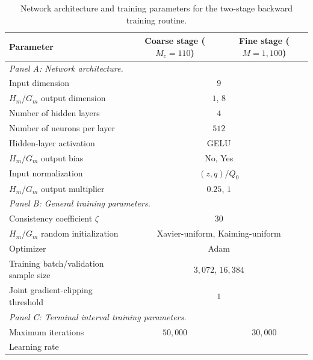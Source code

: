 \begin{table}[!ht]
    \centering
    \caption{Network architecture and training parameters
    for the two-stage backward training routine.}
    \label{tab:two_stage_training}
    \footnotesize
    \setlength{\tabcolsep}{5pt}
    \renewcommand{\arraystretch}{1.0}

    \begin{tabular}{lcc}
        \toprule
        Parameter & Coarse stage ($M_c=110$) & Fine stage ($M=1{,}100$) \\
        \midrule
        \multicolumn{3}{l}{\it Panel A: Network architecture.} \\
        Input dimension & \multicolumn{2}{c}{$9$} \\
        $H_m$/$G_m$ output dimension & \multicolumn{2}{c}{$1$, $8$} \\
        Number of hidden layers & \multicolumn{2}{c}{$4$} \\
        Number of neurons per layer & \multicolumn{2}{c}{$512$} \\
        Hidden-layer activation & \multicolumn{2}{c}{GELU} \\
        $H_m$/$G_m$ output bias & \multicolumn{2}{c}{No, Yes} \\ 
        Input normalization & \multicolumn{2}{c}{$(z,q)/Q_0$} \\
        $H_m$/$G_m$ output multiplier & \multicolumn{2}{c}{$0.25$, $1$} \\
        \midrule
        \multicolumn{3}{l}{\it Panel B: General training parameters.} \\
        Consistency coefficient $\zeta$ & \multicolumn{2}{c}{$30$} \\
        $H_m$/$G_m$ random initialization & \multicolumn{2}{c}{Xavier-uniform, Kaiming-uniform} \\
        Optimizer & \multicolumn{2}{c}{Adam} \\
        Training batch/validation sample size & \multicolumn{2}{c}{$3{,}072$, $16{,}384$} \\
        Joint gradient-clipping threshold & \multicolumn{2}{c}{$1$} \\
        \midrule
        \multicolumn{3}{l}{\it Panel C: Terminal interval training parameters.} \\
        Maximum iterations & $50{,}000$ & $30{,}000$ \\ 
        Learning rate & 

\end{tabular}
\end{table}
